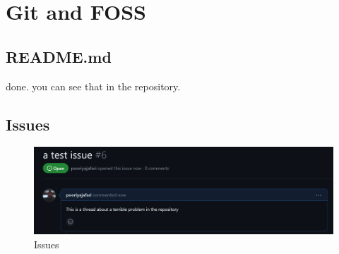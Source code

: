 \documentclass[titlepage]{article}
\begin{document}
\section{Git and FOSS}
\subsection{README.md}
done. you can see that in the repository.

\subsection{Issues}
\begin{figure}[h]
    \centering
    \includegraphics[width=1\textwidth]{img.png}
    \caption{Issues}
\end{figure}
\end{document}
